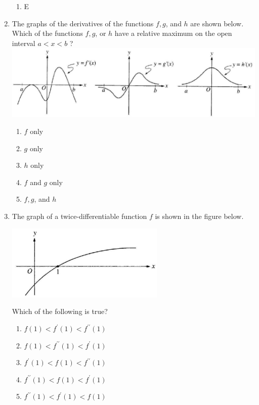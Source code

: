 \documentclass{article}
\begin{document}
\begin{enumerate}
\begin{minipage}[t]{\linewidth}
\begin{enumerate}
			\item E
		\end{enumerate}
	\end{minipage}
	\item
	\begin{minipage}[t]{\linewidth}
		The graphs of the derivatives of the functions \(f, g\), and \(h\) are
shown below. Which of the functions \(f, g\), or \(h\) have a relative
maximum on the open interval \(a<x<b\) ?
\includegraphics[width=5.013333333333334in]{media/f765d5c6-c7a8-54f4-bfaa-b2393cdce2e6.jpg}
\vspace{1em}
		\begin{enumerate}
		\itemsep1em
			\item \(f\) only
			\item \(g\) only
			\item \(h\) only
			\item \(f\) and \(g\) only
			\item \(f, g\), and \(h\)
		\end{enumerate}
	\end{minipage}
	\item
	\begin{minipage}[t]{\linewidth}
		The graph of a twice-differentiable function \(f\) is shown in the
figure below.

\includegraphics[width=2.9833333333333334in]{media/d7b0a695-c4ff-5482-a58c-e1186654c6aa.jpg}

Which of the following is true?
\vspace{1em}
		\begin{enumerate}
		\itemsep1em
			\item \(f(1)<f^{\prime}(1)<f^{\prime \prime}(1)\)
			\item \(f(1)<f^{\prime \prime}(1)<f^{\prime}(1)\)
			\item \(f^{\prime}(1)<f(1)<f^{\prime \prime}(1)\)
			\item \(f^{\prime \prime}(1)<f(1)<f^{\prime}(1)\)
			\item \(f^{\prime \prime}(1)<f^{\prime}(1)<f(1)\)
		\end{enumerate}
	\end{minipage}
\end{enumerate}
\end{document}
